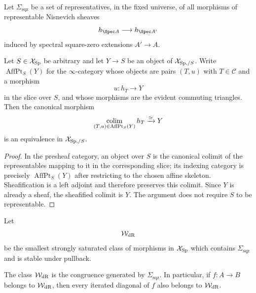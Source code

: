 \begin{definition}
\label{def:infinitesimal-dr-generators}
Let $\Sigma_{\mathrm{sqz}}$ be a set of representatives, in the fixed
universe, of all morphisms of representable Nisnevich sheaves
\[
    h_{\Spec A}\longrightarrow h_{\Spec A'}
\]
induced by spectral square-zero extensions $A'\to A$.
\end{definition}

\begin{lemma}
\label{lem:infinitesimal-affine-density}
Let $S\in\mathcal X_{\mathrm{Sp}}$ be arbitrary and let $Y\to S$ be an object of
$\mathcal X_{\mathrm{Sp},/S}$.  Write $\operatorname{AffPt}_S(Y)$ for the
$\infty$-category whose objects are pairs $(T,u)$ with $T\in\mathcal C$ and
a morphism
\[
    u:h_T\longrightarrow Y
\]
in the slice over $S$, and whose morphisms are the evident commuting triangles.
Then the canonical morphism
\[
    \operatorname*{colim}_{(T,u)\in\operatorname{AffPt}_S(Y)}h_T
    \xrightarrow{\simeq}
    Y
\]
is an equivalence in $\mathcal X_{\mathrm{Sp},/S}$.
\end{lemma}

\begin{proof}
In the presheaf category, an object over $S$ is the canonical colimit of the
representables mapping to it in the corresponding slice; its indexing category
is precisely $\operatorname{AffPt}_S(Y)$ after restricting to the chosen affine
skeleton.  Sheafification is a left adjoint and therefore preserves this
colimit.  Since $Y$ is already a sheaf, the sheafified colimit is $Y$.  The
argument does not require $S$ to be representable.
\end{proof}

\begin{definition}
\label{def:infinitesimal-dr-congruence}
Let
\[
    \mathcal W_{\mathrm{dR}}
\]
be the smallest strongly saturated class of morphisms in
$\mathcal X_{\mathrm{Sp}}$ which contains $\Sigma_{\mathrm{sqz}}$ and is stable under
pullback.
\end{definition}

\begin{lemma}
\label{lem:infinitesimal-dr-generated-congruence}
The class $\mathcal W_{\mathrm{dR}}$ is the congruence generated by
$\Sigma_{\mathrm{sqz}}$.  In particular, if
$f:A\to B$ belongs to $\mathcal W_{\mathrm{dR}}$, then every iterated diagonal of
$f$ also belongs to $\mathcal W_{\mathrm{dR}}$.
\end{lemma}

